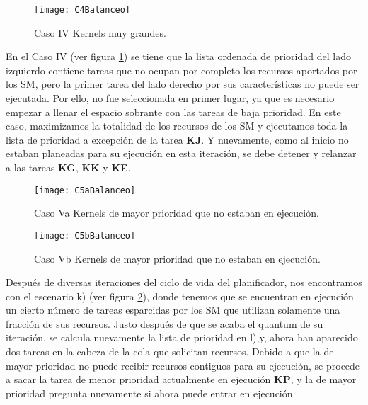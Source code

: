     \begin{figure}[!]
      \centering
        \texttt{[image: C4Balanceo]}
        \caption{Caso IV Kernels muy grandes.}
        \label{fig:C4Balanceo}
    \end{figure}
    
    En el Caso IV (ver figura \ref{fig:C4Balanceo}) se tiene que la lista ordenada de prioridad del lado izquierdo contiene tareas que no ocupan por completo los recursos aportados por los SM, pero la primer tarea del lado derecho por sus características no puede ser ejecutada. 
    Por ello, no fue seleccionada en primer lugar, ya que es necesario empezar a llenar el espacio sobrante con las tareas de baja prioridad. En este caso, maximizamos la totalidad de los recursos de los SM y ejecutamos toda la lista de prioridad a excepción de la tarea \textbf{KJ}. Y nuevamente, como al inicio no estaban planeadas para su ejecución en esta iteración, se debe detener y relanzar a las tareas \textbf{KG}, \textbf{KK} y \textbf{KE}.
\newline

    \begin{figure}[!]
      \centering
        \texttt{[image: C5aBalanceo]}
        \caption{Caso Va Kernels de mayor prioridad que no estaban en ejecución.}
        \label{fig:C5aBalanceo}
    \end{figure}
    
    \begin{figure}[!]
      \centering
        \texttt{[image: C5bBalanceo]}
        \caption{Caso Vb Kernels de mayor prioridad que no estaban en ejecución.}
        \label{fig:C5bBalanceo}
    \end{figure}
    
    Después de diversas iteraciones del ciclo de vida del planificador, nos encontramos con el escenario k) (ver figura \ref{fig:C5aBalanceo}), donde tenemos que se encuentran en ejecución un cierto número de tareas esparcidas por los SM que utilizan solamente una fracción de sus recursos. Justo después de que se acaba el quantum de su iteración, se calcula nuevamente la lista de prioridad en l),y, ahora han aparecido dos tareas en la cabeza de la cola que solicitan recursos.
    Debido a que la de mayor prioridad no puede recibir recursos contiguos para su ejecución, se procede a sacar la tarea de menor prioridad actualmente en ejecución \textbf{KP}, y la de mayor prioridad pregunta nuevamente si ahora puede entrar en ejecución.
\newline

